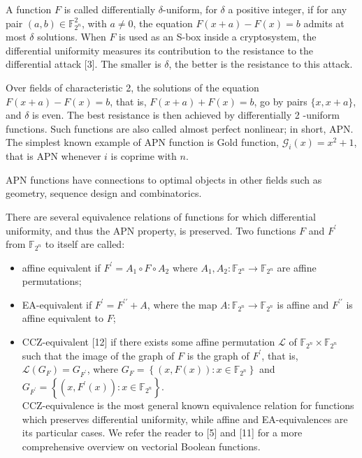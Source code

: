 \documentclass[10pt]{article}
\begin{document}
A function $F$ is called differentially $\delta$-uniform, for $\delta$ a positive integer, if for any pair $(a, b) \in \mathbb{F}_{2^{n}}^{2}$, with $a \neq 0$, the equation $F(x+a)-F(x)=b$ admits at most $\delta$ solutions. When $F$ is used as an S-box inside a cryptosystem, the differential uniformity measures its contribution to the resistance to the differential attack [3]. The smaller is $\delta$, the better is the resistance to this attack.

Over fields of characteristic 2, the solutions of the equation $F(x+a)-F(x)=b$, that is, $F(x+a)+F(x)=b$, go by pairs $\{x, x+a\}$, and $\delta$ is even. The best resistance is then achieved by differentially 2 -uniform functions. Such functions are also called almost perfect nonlinear; in short, APN. The simplest known example of APN function is Gold function, $\mathscr{G}_{i}(x)=x^{2}+1$, that is APN whenever $i$ is coprime with $n$.

APN functions have connections to optimal objects in other fields such as geometry, sequence design and combinatorics.

There are several equivalence relations of functions for which differential uniformity, and thus the APN property, is preserved. Two functions $F$ and $F^{\prime}$ from $\mathbb{F}_{2^{n}}$ to itself are called:

\begin{itemize}
  \item affine equivalent if $F^{\prime}=A_{1} \circ F \circ A_{2}$ where $A_{1}, A_{2}: \mathbb{F}_{2^{n}} \rightarrow \mathbb{F}_{2^{n}}$ are affine permutations;
  \item EA-equivalent if $F^{\prime}=F^{\prime \prime}+A$, where the map $A: \mathbb{F}_{2^{n}} \rightarrow \mathbb{F}_{2^{n}}$ is affine and $F^{\prime \prime}$ is affine equivalent to $F$;
  \item CCZ-equivalent [12] if there exists some affine permutation $\mathscr{L}$ of $\mathbb{F}_{2^{n}} \times \mathbb{F}_{2^{n}}$ such that the image of the graph of $F$ is the graph of $F^{\prime}$, that is, $\mathscr{L}\left(G_{F}\right)=G_{F^{\prime}}$, where $G_{F}=\left\{(x, F(x)): x \in \mathbb{F}_{2^{n}}\right\}$ and $G_{F^{\prime}}=\left\{\left(x, F^{\prime}(x)\right): x \in \mathbb{F}_{2^{n}}\right\}$.\\[0pt]
CCZ-equivalence is the most general known equivalence relation for functions which preserves differential uniformity, while affine and EA-equivalences are its particular cases. We refer the reader to [5] and [11] for a more comprehensive overview on vectorial Boolean functions.
\end{itemize}
\end{document}
